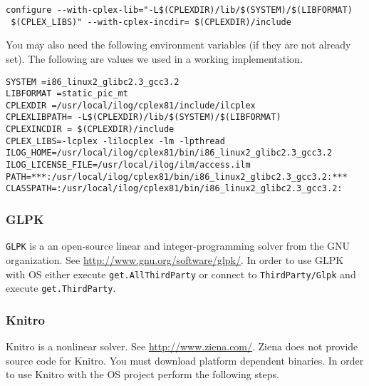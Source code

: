 \documentclass[11pt]{article}
\renewcommand{\_}{{\char"5F}}
\renewcommand{\{}{{\char"7B}}
\renewcommand{\}}{{\char"7D}}
\renewcommand{\^}{{\char"0D}}
\renewcommand{\'}{{\char"0D}}
\begin{document}
\begin{verbatim}
configure --with-cplex-lib="-L$(CPLEXDIR)/lib/$(SYSTEM)/$(LIBFORMAT) 
 $(CPLEX_LIBS)" --with-cplex-incdir= $(CPLEXDIR)/include
\end{verbatim}

You may also need the following environment variables (if they are not already set). The following are values we used in a working implementation.
\begin{verbatim}
SYSTEM =i86_linux2_glibc2.3_gcc3.2
LIBFORMAT =static_pic_mt
CPLEXDIR =/usr/local/ilog/cplex81/include/ilcplex
CPLEXLIBPATH= -L$(CPLEXDIR)/lib/$(SYSTEM)/$(LIBFORMAT)
CPLEXINCDIR = $(CPLEXDIR)/include
CPLEX_LIBS=-lcplex -lilocplex -lm -lpthread 
ILOG_HOME=/usr/local/ilog/cplex81/bin/i86_linux2_glibc2.3_gcc3.2
ILOG_LICENSE_FILE=/usr/local/ilog/ilm/access.ilm
PATH=***:/usr/local/ilog/cplex81/bin/i86_linux2_glibc2.3_gcc3.2:***
CLASSPATH=:/usr/local/ilog/cplex81/bin/i86_linux2_glibc2.3_gcc3.2: 
\end{verbatim}

\subsubsection{GLPK}

{\tt GLPK} is a an open-source linear and integer-programming solver from the GNU organization. See \url{http://www.gnu.org/software/glpk/}.  In order to use GLPK with OS either execute {\tt get.AllThirdParty} or connect to {\tt ThirdParty/Glpk} and execute {\tt get.ThirdParty}.










\subsubsection{Knitro}


Knitro is a nonlinear solver. See \url{http://www.ziena.com/}.  Ziena does not provide source code for Knitro.  You must download platform dependent binaries.   In order to use Knitro with the OS project perform the following steps.
\end{document}
